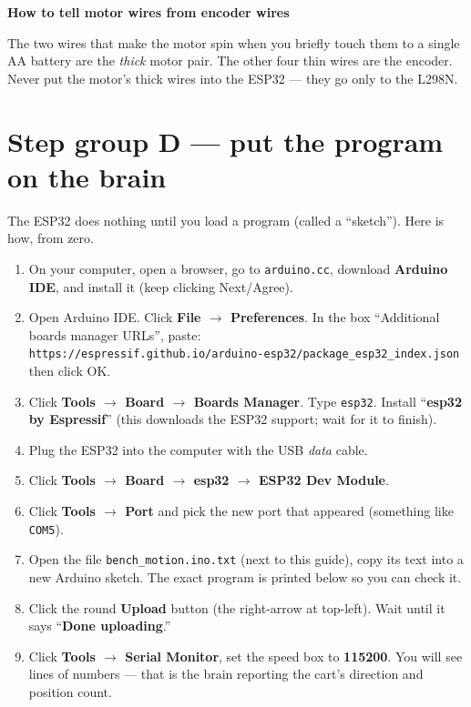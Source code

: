 \documentclass[11pt,a4paper]{article}
\newenvironment{tipbox}[1]
  {\par\medskip\noindent\begin{lrbox}{\gbbox}\begin{minipage}{0.95\linewidth}\footnotesize\textbf{#1}\par\smallskip}
  {\end{minipage}\end{lrbox}\setlength{\fboxsep}{8pt}\fcolorbox{green!45!black}{green!5}{\usebox{\gbbox}}\par\medskip}
\begin{document}
\begin{tipbox}{How to tell motor wires from encoder wires}
The two wires that make the motor spin when you briefly touch them to a single AA battery are the
\emph{thick} motor pair. The other four thin wires are the encoder. Never put the motor's thick wires
into the ESP32 --- they go only to the L298N.
\end{tipbox}

\section{Step group D --- put the program on the brain}

The ESP32 does nothing until you load a program (called a ``sketch''). Here is how, from zero.

\begin{enumerate}[leftmargin=*,itemsep=3pt]
  \item On your computer, open a browser, go to \texttt{arduino.cc}, download \textbf{Arduino IDE}, and
  install it (keep clicking Next/Agree).
  \item Open Arduino IDE. Click \textbf{File $\to$ Preferences}. In the box ``Additional boards manager
  URLs'', paste:\\
  \texttt{https://espressif.github.io/arduino-esp32/package\_esp32\_index.json}\\ then click OK.
  \item Click \textbf{Tools $\to$ Board $\to$ Boards Manager}. Type \texttt{esp32}. Install
  ``\textbf{esp32 by Espressif}'' (this downloads the ESP32 support; wait for it to finish).
  \item Plug the ESP32 into the computer with the USB \emph{data} cable.
  \item Click \textbf{Tools $\to$ Board $\to$ esp32 $\to$ ESP32 Dev Module}.
  \item Click \textbf{Tools $\to$ Port} and pick the new port that appeared (something like
  \texttt{COM5}).
  \item Open the file \texttt{bench\_motion.ino.txt} (next to this guide), copy its text into a new
  Arduino sketch. The exact program is printed below so you can check it.
  \item Click the round \textbf{Upload} button (the right-arrow at top-left). Wait until it says
  ``\textbf{Done uploading}.''
  \item Click \textbf{Tools $\to$ Serial Monitor}, set the speed box to \textbf{115200}. You will see
  lines of numbers --- that is the brain reporting the cart's direction and position count.
\end{enumerate}
\end{document}

